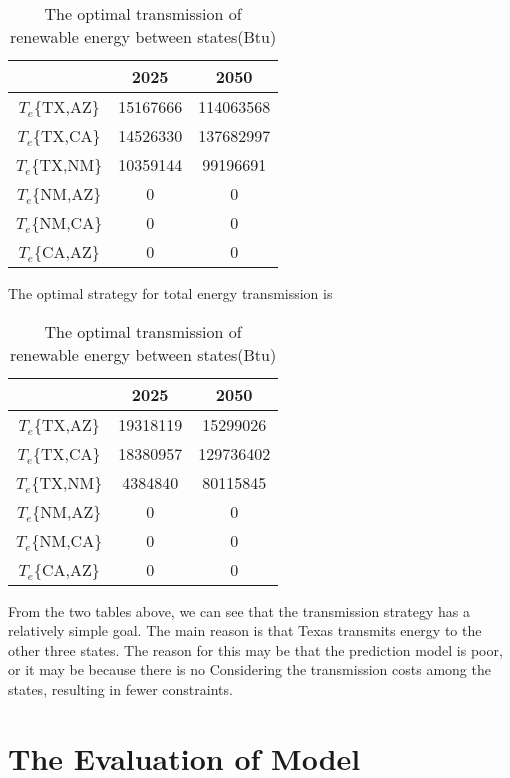 \documentclass{mcmthesis}
\begin{document}
\begin{table}[]
\centering
\caption{
  The optimal transmission of renewable energy between states(Btu)}
\label{
  The optimal transmission of renewable energy between states(Btu)}
\begin{tabular}{|c|c|c|}
\hline
       &   2025    &    2050       \\ \hline
$T_e$\{TX,AZ\} & 15167666 & 114063568 \\ \hline
$T_e$\{TX,CA\} & 14526330 & 137682997 \\ \hline
$T_e$\{TX,NM\} & 10359144 & 99196691  \\ \hline
$T_e$\{NM,AZ\} & 0        & 0         \\ \hline
$T_e$\{NM,CA\} & 0        & 0         \\ \hline
$T_e$\{CA,AZ\} & 0        & 0         \\ \hline
\end{tabular}
\end{table}

The optimal strategy for total energy transmission is
\begin{table}[]
  \centering
  \caption{
    The optimal transmission of renewable energy between states(Btu)}
  \label{
    The optimal transmission of total  energy between states(Btu)}
  \begin{tabular}{|c|c|c|}
  \hline
         &   2025    &    2050       \\ \hline
  $T_e$\{TX,AZ\} & 19318119 & 15299026 \\ \hline
  $T_e$\{TX,CA\} & 18380957 & 129736402 \\ \hline
  $T_e$\{TX,NM\} & 4384840 & 80115845  \\ \hline
  $T_e$\{NM,AZ\} & 0        & 0         \\ \hline
  $T_e$\{NM,CA\} & 0        & 0         \\ \hline
  $T_e$\{CA,AZ\} & 0        & 0         \\ \hline
  \end{tabular}
  \end{table}

From the two tables above, we can see that the transmission strategy has a relatively simple goal. The main reason is that Texas transmits energy to the other three states. The reason for this may be that the prediction model is poor, or it may be because there is no Considering the transmission costs among the states, resulting in fewer constraints.
  
\section{The Evaluation of Model}
\end{document}

